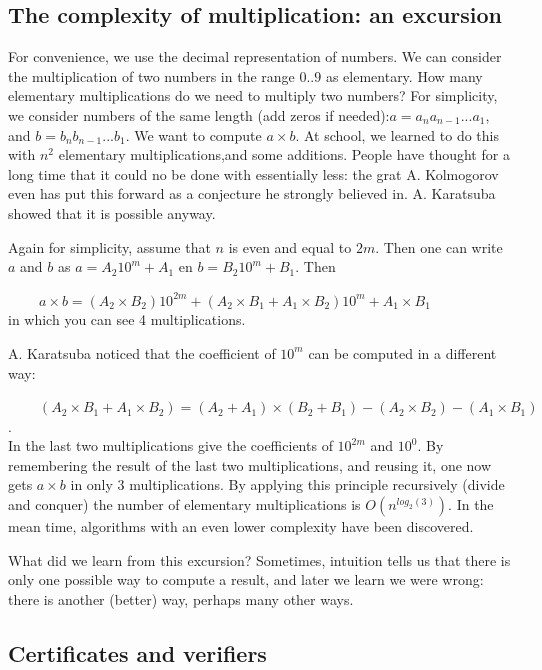 \subsection{The complexity of multiplication: an excursion}

For convenience, we use the decimal representation of numbers.
We can consider the multiplication of two numbers in the range $0..9$
as elementary. How many elementary multiplications do we need to
multiply two numbers? For simplicity, we consider numbers of the same
length (add zeros if needed):$a= a_na_{n-1}...a_1$, and
$b = b_nb_{n-1}...b_1$. We want to compute $a \times b$. At school, we
learned to do this with $n^2$ elementary multiplications,and some
additions. People have thought for a long time that it could no be
done with essentially less: the grat A. Kolmogorov even has put this
forward as a conjecture he strongly believed in. A. Karatsuba showed
that it is possible anyway.

Again for simplicity, assume that $n$ is even and equal to $2m$. Then
one can write $a$ and $b$ as
%
$a = A_{2}10^m + A_1$ en $b = B_{2}10^m + B_1$.
%
Then 

$~~~~~~~~~~a \times b = (A_{2}\times B_{2})10^{2m} + (A_{2}\times B_1 + A_1\times B_{2})10^m + A_1\times B_1 $ \\
in which you can see 4 multiplications.

A. Karatsuba noticed that the coefficient of $10^m$ can be computed in
a different way:

$~~~~~~~~~~(A_{2}\times B_1 + A_1\times B_{2}) = (A_{2} + A_1) \times (B_{2} +
B_1) - (A_{2}\times B_{2}) - (A_1\times B_1)$. \\
In the last two multiplications give the coefficients of $10^{2m}$ and
$10^0$. By remembering the result of the last two multiplications, and
reusing it, one now gets $a \times b$ in only 3 multiplications.
By applying this principle recursively (divide and conquer) the number
of elementary multiplications is $O(n^{log_2(3)})$. In the mean time,
algorithms with an even lower complexity have been discovered.

What did we learn from this excursion? Sometimes, intuition tells us
that there is only one possible way to compute a result, and later we
learn we were wrong: there is another (better) way, perhaps many other
ways.

\subsection{Certificates and verifiers}

